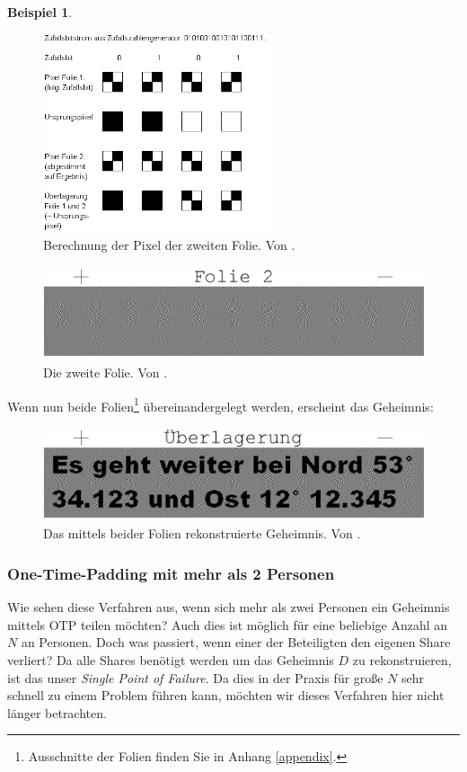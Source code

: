 \documentclass[12pt, a4paper, oneside, titlepage]{report}
\theoremstyle{definition}
\newtheorem{bsp}[lemma]{Beispiel}
\begin{document}
\begin{bsp}
		\begin{figure}[H]
			\centering
			\includegraphics[width=0.6\textwidth]{images/visual1.png}
			\caption{Berechnung der Pixel der zweiten Folie. Von \cite{visual}.}
			\label{generation-of-2nd-sheet}
		\end{figure}
	
		\begin{figure}[H]
			\centering
			\includegraphics[width=1.\textwidth]{images/visual3.png}
			\caption{Die zweite Folie. Von \cite{visual}.}
			\label{sheet2}
		\end{figure}
		\noindent
		Wenn nun beide Folien\footnote{Ausschnitte der Folien finden Sie in Anhang \ref{appendix}.} übereinandergelegt werden, erscheint das Geheimnis:
		
		\begin{figure}[H]
			\centering
			\includegraphics[width=1.\textwidth]{images/visual4.png}
			\caption{Das mittels beider Folien rekonstruierte Geheimnis. Von \cite{visual}.}
			\label{secret-image}
		\end{figure}
	\end{bsp}
	
	\subsubsection{One-Time-Padding mit mehr als 2 Personen}
	Wie sehen diese Verfahren aus, wenn sich mehr als zwei Personen ein Geheimnis mittels OTP teilen möchten? Auch dies ist möglich für eine beliebige Anzahl an $ N $ an Personen. Doch was passiert, wenn einer der Beteiligten den eigenen Share verliert? Da alle Shares benötigt werden um das Geheimnis $ D $ zu rekonstruieren, ist das unser \emph{Single Point of Failure}. Da dies in der Praxis für große $ N $ sehr schnell zu einem Problem führen kann, möchten wir dieses Verfahren hier nicht länger betrachten.
	
\end{document}
